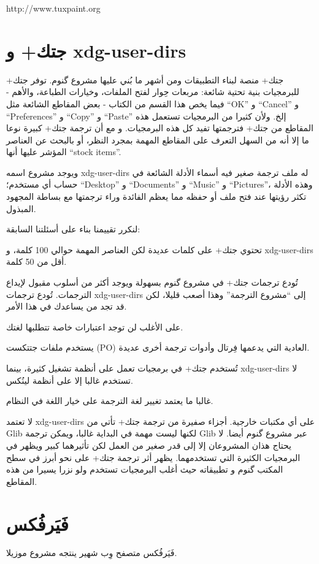 http://www.tuxpaint.org

\section{جتك+ و xdg-user-dirs}
جتك+ منصة لبناء التطبيقات ومن أشهر ما بُني عليها مشروع گنوم. توفر جتك+
للبرمجيات بنية تحتية شائعة: مربعات حِوار لفتح الملفات، وخيارات الطباعة،
والأهم - فيما يخص هذا القسم من الكتاب - بعض المقاطع الشائعة مثل “OK” و
“Cancel” و “Preferences” و “Copy” و “Paste” إلخ. ولأن كثيرا من
البرمجيات تستعمل هذه المقاطع من جتك+ فترجمتها تفيد كل هذه البرمجيات. و
مع أن ترجمة جتك+ كبيرة نوعا ما إلا أنه من السهل التعرف على المقاطع
المهمة بمجرد النظر، أو بالبحث عن العناصر المؤشر عليها أنها “stock
items”.

ويوجد مشروع اسمه xdg-user-dirs له ملف ترجمة صغير فيه أسماء الأدلة
الشائعة في حساب أي مستخدم؛ “Desktop” و “Documents” و “Music” و
“Pictures”، وهذه الأدلة تكثر رؤيتها عند فتح ملف أو حفظه مما يعظم
الفائدة وراء ترجمتها مع بساطة المجهود المبذول.

لنكرر تقييمنا بناء على أسئلتنا السابقة:

\startitemize[1]
\item تحتوي جتك+ على كلمات عديدة لكن العناصر المهمة حوالي 100 كلمة، و
xdg-user-dirs أقل من 50 كلمة.
\item تُودع ترجمات جتك+ في مشروع گنوم بسهولة ويوجد أكثر من أسلوب مقبول
لإيداع الترجمات. تُودع ترجمات xdg-user-dirs إلى “مشروع الترجمة” وهذا
أصعب قليلا، لكن قد تجد من يساعدك في هذا الأمر.
\item على الأغلب لن توجد اعتبارات خاصة تتطلبها لغتك.
\item يستخدم ملفات جتتكست (PO) العادية التي يدعمها فِرتال وأدوات ترجمة
أخرى عديدة.
\item تُستخدم جتك+ في برمجيات تعمل على أنظمة تشغيل كثيرة، بينما
xdg-user-dirs لا تستخدم غالبا إلا على أنظمة لينُكس.
\item غالبا ما يعتمد تغيير لغة الترجمة على خيار اللغة في النظام.
\item لا تعتمد xdg-user-dirs على أي مكتبات خارجية. أجزاء صفيرة من ترجمة
جتك+ تأتي من Glib لكنها ليست مهمة في البداية غالبا، ويمكن ترجمة Glib
عبر مشروع گنوم أيضا.
\stopitemize
لا يحتاج هذان المشروعان إلا إلى قدر صغير من العمل لكن تأثيرهما كبير
ويظهر في البرمجيات الكثيرة التي تستخدمهما. يظهر أثر ترجمة جتك+ على نحو
أبرز في سطح المكتب گنوم و تطبيقاته حيث أغلب البرمجيات تستخدم ولو نزرا
يسيرا من هذه المقاطع.

\section{فَيَرفُكس}
فَيَرفُكس متصفح وِب شهير ينتجه مشروع موزيلا.

